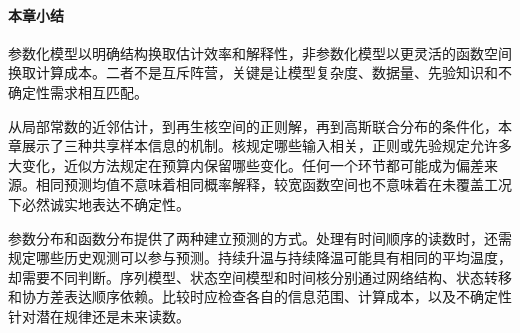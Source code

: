 \paragraph{本章小结}
参数化模型以明确结构换取估计效率和解释性，非参数化模型以更灵活的函数空间换取计算成本。二者不是互斥阵营，关键是让模型复杂度、数据量、先验知识和不确定性需求相互匹配。

从局部常数的近邻估计，到再生核空间的正则解，再到高斯联合分布的条件化，本章展示了三种共享样本信息的机制。核规定哪些输入相关，正则或先验规定允许多大变化，近似方法规定在预算内保留哪些变化。任何一个环节都可能成为偏差来源。相同预测均值不意味着相同概率解释，较宽函数空间也不意味着在未覆盖工况下必然诚实地表达不确定性。

参数分布和函数分布提供了两种建立预测的方式。处理有时间顺序的读数时，还需规定哪些历史观测可以参与预测。持续升温与持续降温可能具有相同的平均温度，却需要不同判断。序列模型、状态空间模型和时间核分别通过网络结构、状态转移和协方差表达顺序依赖。比较时应检查各自的信息范围、计算成本，以及不确定性针对潜在规律还是未来读数。
